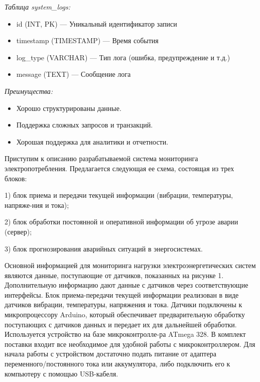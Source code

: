 \begin{multicols}{2}
\emph{Таблица system\_logs:}

\begin{itemize}
  \setlength{\itemindent}{1cm}

\item
  id (INT, PK) --- Уникальный идентификатор записи
\item
  timestamp (TIMESTAMP) --- Время события
\item
  log\_type (VARCHAR) --- Тип лога (ошибка, предупреждение и т.д.)
\item
  message (TEXT) --- Сообщение лога
\end{itemize}

\emph{Преимущества:}

\begin{itemize}
  \setlength{\itemindent}{1cm}

\item
  Хорошо структурированы данные.
\item
  Поддержка сложных запросов и транзакций.
\item
  Хорошая поддержка для аналитики и отчетности.
\end{itemize}

Приступим к описанию разрабатываемой система мониторинга
электропотребления. Предлагается следующая ее схема, состоящая из трех
блоков:

1) блок приема и передачи текущей информации (вибрации, температуры,
напряже-ния и тока);

2) блок обработки постоянной и оперативной информации об угрозе аварии
(сервер);

3) блок прогнозирования аварийных ситуаций в энергосистемах.

Основной информацией для мониторинга нагрузки электроэнергетических
систем являются данные, поступающие от датчиков, показанных на рисунке
1. Дополнительную информацию дают данные с датчиков через
соответствующие интерфейсы. Блок приема-передачи текущей информации
реализован в виде датчиков вибрации, температуры, напряжения и тока.
Датчики подключены к микропроцессору Arduino, который обеспечивает
предварительную обработку поступающих с датчиков данных и передает их
для дальнейшей обработки. Используется устройство на базе
микроконтролле-ра ATmega 328. В комплект поставки входит все необходимое
для удобной работы с микроконтроллером. Для начала работы с устройством
достаточно подать питание от адаптера переменного/постоянного тока или
аккумулятора, либо подключить его к компьютеру с помощью USB-кабеля.


\end{multicols}
